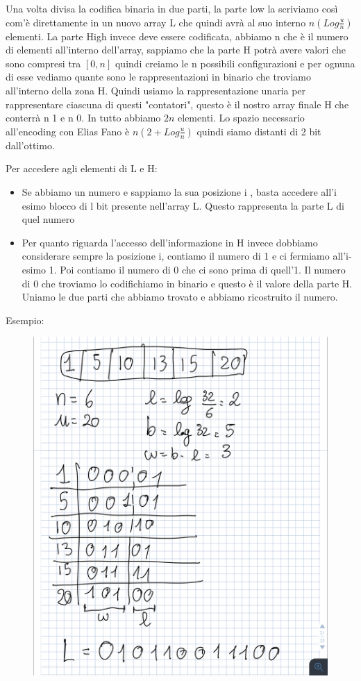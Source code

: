 \documentclass[14pt]{extreport}
\begin{document}
Una volta divisa la codifica binaria in due parti, la parte low la scriviamo così com'è direttamente in un nuovo array L che quindi avrà al suo interno $n(Log\frac{u}{n})$ elementi.
La parte High invece deve essere codificata, abbiamo n che è il numero di elementi all'interno dell'array, sappiamo che la parte H potrà avere valori che sono compresi tra $[0,n]$ quindi creiamo le n possibili configurazioni e per ognuna di esse vediamo quante sono le rappresentazioni in binario che troviamo all'interno della zona H.
Quindi usiamo la rappresentazione unaria per rappresentare ciascuna di questi "contatori", questo è il nostro array finale H che conterrà n 1 e n 0. In tutto abbiamo $2n$ elementi.
Lo spazio necessario all'encoding con Elias Fano è $n(2+Log\frac{u}{n})$ quindi siamo distanti di 2 bit dall'ottimo.


Per accedere agli elementi di L e H:
\begin{itemize}
\item Se abbiamo un numero e sappiamo la sua posizione i , basta accedere all'i esimo blocco di l bit presente nell'array L. Questo rappresenta la parte L di quel numero
\item Per quanto riguarda l'accesso dell'informazione in H invece dobbiamo considerare sempre la posizione i, contiamo il numero di 1 e ci fermiamo all'i-esimo 1. Poi contiamo il numero di 0 che ci sono prima di quell'1. Il numero di 0 che troviamo lo codifichiamo in binario e questo è il valore della parte H.
Uniamo le due parti che abbiamo trovato e abbiamo ricostruito il numero.
\end{itemize}

Esempio:

\begin{figure}[H]
\centering
  \includegraphics[width=0.7\linewidth]{EF1.jpg}
\end{figure}
\end{document}
